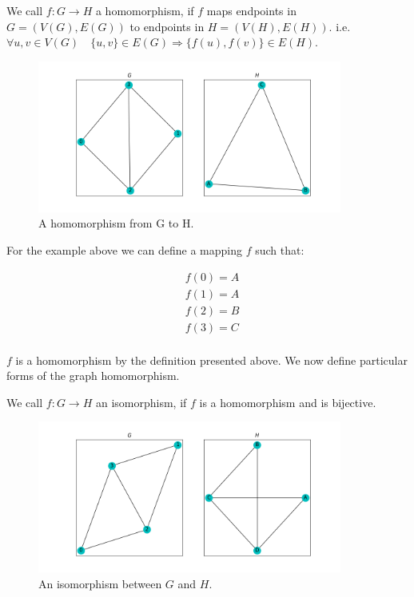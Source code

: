 \begin{dfn}
We call $f: G \rightarrow H$ a homomorphism,
if $f$ maps endpoints in $G=(V(G),E(G))$ to endpoints in $H=(V(H),E(H))$.
i.e. $ \forall u,v \in V(G) \quad \{u,v\} \in E(G) \Rightarrow \{f(u),
f(v)\} \in E(H)$.
\end{dfn}

\begin{figure}[h!]
    \includegraphics[width=10cm]{Images/graph_homomorphism.png}
    \centering
    \caption{A homomorphism from G to H.}
\end{figure}

For the example above we can define a mapping $f$ such that:

\begin{align*}
    &f(0) = A\\
    &f(1) = A\\
    &f(2) = B\\
    &f(3) = C\\ 
\end{align*}

$f$ is a homomorphism by the definition presented above. 
We now define particular forms of the graph homomorphism.

\begin{dfn}
    We call $f: G \rightarrow H$ an isomorphism,
 if $f$ is a homomorphism and is bijective.
\end{dfn}

\begin{figure}[h!]
    \includegraphics[width=10cm]{Images/graph_isomoprhism.png}
    \centering
    \caption{An isomorphism between $G$ and $H$.}
\end{figure}


